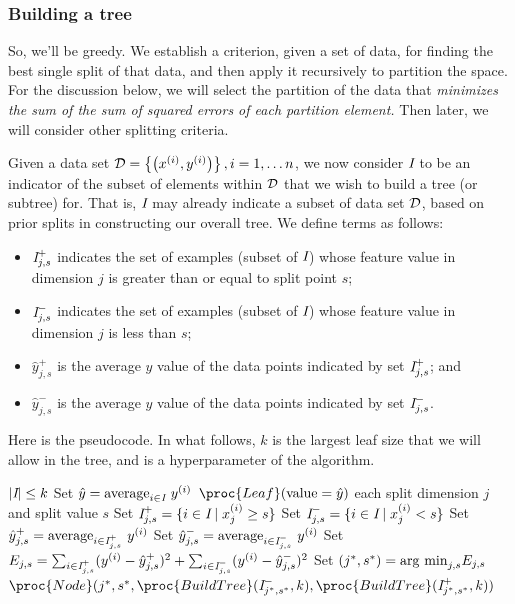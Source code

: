\subsubsection{Building a tree}
So, we'll be greedy.  We establish a criterion, given a set of data,
for finding the best single split of that data, and then apply it
recursively to partition the space.  For the discussion below, we
will select the partition of
the data that {\em minimizes the sum of the sum of squared errors of
    each partition element.} Then later, we will consider other
splitting criteria.

Given a data set ${\cal D} = \left\{\left(x^{(i)},
  y^{(i)}\right)\right\}, i = 1, \ldots n$, we now consider ${\emph I}$ to be an indicator
of the subset of elements within ${\cal D}$ that we wish to build a tree (or subtree) for.
That is, ${\emph I}$ may already indicate a subset of data set ${\cal D}$, based on
prior splits in constructing our overall tree. We define terms as follows:


\begin{itemize}
  \item ${\emph I}^+_{j,s}$ indicates the set of examples (subset of
        ${\emph I}$) whose feature value in dimension $j$ is greater than or
        equal to split point $s$;
  \item ${\emph I}^-_{j,s}$ indicates the set of examples (subset of
        ${\emph I}$) whose feature value in dimension $j$ is less than $s$;
  \item $\hat{y}^+_{j,s}$ is the average $y$ value of the data points
        indicated by set ${\emph I}^+_{j,s}$; and
  \item $\hat{y}^-_{j,s}$ is the average $y$ value of the data points
        indicated by set ${\emph I}^-_{j,s}$.
\end{itemize}

Here is the pseudocode. In what follows, $k$ is the largest leaf
size that we will allow in the tree, and is a hyperparameter of the algorithm.
\begin{codebox}
  \li  \If $|{\emph I}| \leq k$
  \Then
  \li    Set $\hat{y} = {\rm average}_{i \in {\emph I}}~y^{(i)}$
  \li    \Return $\proc{Leaf}({\rm value} = \hat{y})$
  \li  \Else
  \li   \For each split dimension $j$ and split value $s$
  \li     \Do
  Set ${\emph I}^+_{j,s} = \{i \in {\emph I} \mid x_j^{(i)} \geq s\}$
  \li Set ${\emph I}^-_{j,s} = \{i \in {\emph I} \mid x_j^{(i)} < s\}$
  \li Set $\hat{y}^+_{j,s} = {\rm average}_{i \in {\emph I}^+_{j,s}} ~ y^{(i)}$
  \li Set $\hat{y}^-_{j,s} = {\rm average}_{i \in {\emph I}^-_{j,s}} ~ y^{(i)}$
  \li Set $E_{j,s} = \sum_{i \in {\emph I}^+_{j,s}} (y^{(i)} - \hat{y}^+_{j,s})^2 +
    \sum_{i \in {\emph I}^-_{j,s}} (y^{(i)} - \hat{y}^-_{j,s})^2$
  \End
  \li        Set $(j^*, s^*) = {\rm arg~min}_{j,s} E_{j,s}$
  \End
  \li    \Return $\proc{Node}(j^*, s^*, \proc{BuildTree}({\emph I}^-_{j^*, s^*}, k), \proc{BuildTree}({\emph I}^+_{j^*, s^*}, k))$
\end{codebox}

